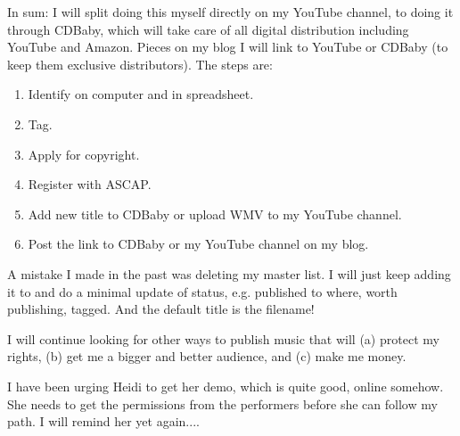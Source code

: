 \documentclass[english,11pt,letterpaper,onecolumn]{scrartcl}
\begin{document}
\noindent In sum: I will split doing this myself directly on my YouTube channel, to doing it through CDBaby, which will take care of all digital distribution including YouTube and Amazon. Pieces on my blog I will link to YouTube or CDBaby (to keep them exclusive distributors). The steps are:

\begin{enumerate}
\item Identify on computer and in spreadsheet.
\item Tag. 
\item Apply for copyright.
\item Register with ASCAP.
\item Add new title to CDBaby or upload WMV to my YouTube channel.
\item Post the link to CDBaby or my YouTube channel on my blog.
\end{enumerate}

A mistake I made in the past was deleting my master list. I will just keep adding it to and do a minimal update of status, e.g. published to where, worth publishing, tagged. And the default title is the filename!

I will continue looking for other ways to publish music that will (a) protect my rights, (b) get me a bigger and better audience, and (c) make me money.

I have been urging Heidi to get her demo, which is quite good, online somehow. She needs to get the permissions from the performers before she can follow my path. I will remind her yet again....
\end{document}
